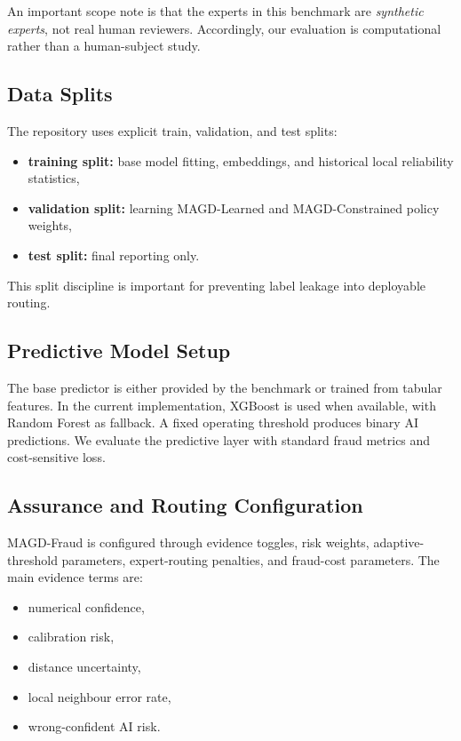 An important scope note is that the experts in this benchmark are \emph{synthetic experts}, not real human reviewers. Accordingly, our evaluation is computational rather than a human-subject study.

\subsection{Data Splits}
\label{subsec:data_splits}

The repository uses explicit train, validation, and test splits:
\begin{itemize}
\item \textbf{training split:} base model fitting, embeddings, and historical local reliability statistics,
\item \textbf{validation split:} learning MAGD-Learned and MAGD-Constrained policy weights,
\item \textbf{test split:} final reporting only.
\end{itemize}

This split discipline is important for preventing label leakage into deployable routing.

\subsection{Predictive Model Setup}
\label{subsec:model_setup}

The base predictor is either provided by the benchmark or trained from tabular features. In the current implementation, XGBoost is used when available, with Random Forest as fallback. A fixed operating threshold produces binary AI predictions. We evaluate the predictive layer with standard fraud metrics and cost-sensitive loss.

\subsection{Assurance and Routing Configuration}
\label{subsec:assurance_setup}

MAGD-Fraud is configured through evidence toggles, risk weights, adaptive-threshold parameters, expert-routing penalties, and fraud-cost parameters. The main evidence terms are:
\begin{itemize}
\item numerical confidence,
\item calibration risk,
\item distance uncertainty,
\item local neighbour error rate,
\item wrong-confident AI risk.
\end{itemize}

